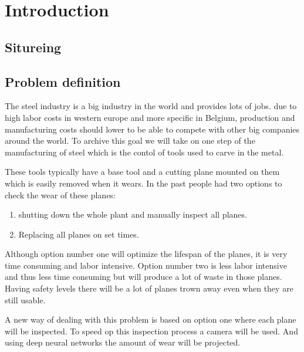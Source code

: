 
\chapter{Introduction}

\section{Situreing}


\section{Problem definition}

    The steel industry is a big industry in the world and provides lots of jobs. due to high labor costs in western europe and more specific in Belgium, production and manufacturing costs should lower to be able to compete with other big companies around the world. To archive this goal we will take on one step of the manufacturing of steel which is the contol of tools used to carve in the metal.
    
    These tools typically have a base tool and a cutting plane mounted on them which is easily removed when it wears. In the past people had two options to check the wear of these planes: 
    \begin{enumerate}
        \item shutting down the whole plant and manually inspect all planes.
        \item Replacing all planes on set times.
    \end{enumerate}
     Although option number one will optimize the lifespan of the planes, it is very time consuming and labor intensive. Option number two is less labor intensive and thus less time consuming but will produce a lot of waste in those planes. Having safety levels there will be a lot of planes trown away even when they are still usable.
     
     A new way of dealing with this problem is based on option one where each plane will be inspected. To speed op this inspection process a camera will be used. And using deep neural networks the amount of wear will be projected.
     
